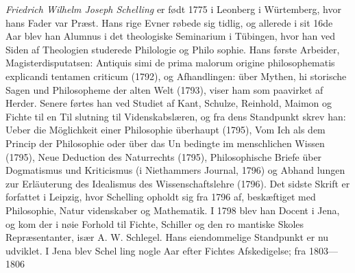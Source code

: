 \documentclass[12pt,a4paper]{book}
\begin{document}
\emph{Friedrich Wilhelm Joseph Schelling} er født 1775
i Leonberg i Würtemberg, hvor hans Fader var Præst. Hans
rige Evner røbede sig tidlig, og allerede i sit 16de Aar blev
han Alumnus i det theologiske Seminarium i Tübingen, hvor
han ved Siden af Theologien studerede Philologie og Philo\-%
sophie. Hans første Arbeider, Magisterdisputatsen: Antiquis\-%
simi de prima malorum origine philosophematis explicandi
tentamen criticum (1792), og Afhandlingen: über Mythen, hi\-%
storische Sagen und Philosopheme der alten Welt (1793), viser
ham som paavirket af Herder. Senere førtes han ved Studiet
af Kant, Schulze, Reinhold, Maimon og Fichte til en Til\-%
slutning til Videnskabslæren, og fra dens Standpunkt skrev
han: Ueber die Möglichkeit einer Philosophie überhaupt (1795),
Vom Ich als dem Princip der Philosophie oder über das Un\-%
bedingte im menschlichen Wissen (1795), Neue Deduction des
Naturrechts (1795), Philosophische Briefe über Dogmatismus
und Kriticismus (i Niethammers Journal, 1796) og Abhand\-%
lungen zur Erläuterung des Idealismus des Wissenschaftslehre
(1796). Det sidste Skrift er forfattet i Leipzig, hvor Schelling
opholdt sig fra 1796 af, beskæftiget med Philosophie, Natur\-%
videnskaber og Mathematik. I 1798 blev han Docent i Jena,
og kom der i nøie Forhold til Fichte, Schiller og den ro\-%
mantiske Skoles Repræsentanter, især A. W. Schlegel. Hans
eiendommelige Standpunkt er nu udviklet. I Jena blev Schel\-%
ling nogle Aar efter Fichtes Afskedigelse; fra 1803---1806
\end{document}
